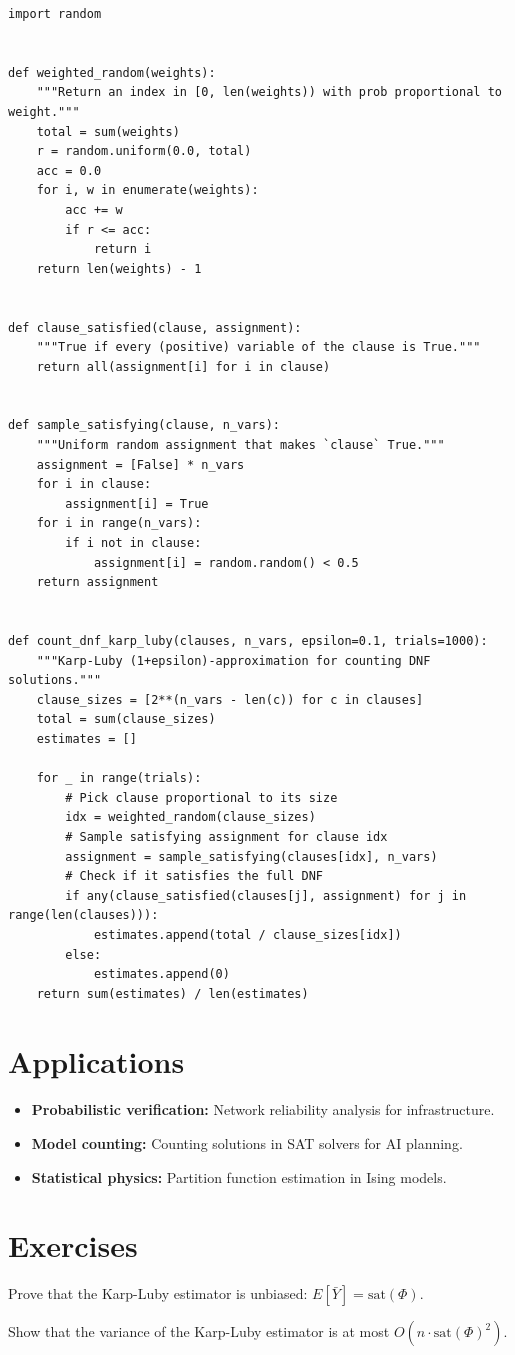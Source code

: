 \begin{lstlisting}[style=python, caption=Karp-Luby DNF Counting~\cite{karp-luby83}]
import random


def weighted_random(weights):
    """Return an index in [0, len(weights)) with prob proportional to weight."""
    total = sum(weights)
    r = random.uniform(0.0, total)
    acc = 0.0
    for i, w in enumerate(weights):
        acc += w
        if r <= acc:
            return i
    return len(weights) - 1


def clause_satisfied(clause, assignment):
    """True if every (positive) variable of the clause is True."""
    return all(assignment[i] for i in clause)


def sample_satisfying(clause, n_vars):
    """Uniform random assignment that makes `clause` True."""
    assignment = [False] * n_vars
    for i in clause:
        assignment[i] = True
    for i in range(n_vars):
        if i not in clause:
            assignment[i] = random.random() < 0.5
    return assignment


def count_dnf_karp_luby(clauses, n_vars, epsilon=0.1, trials=1000):
    """Karp-Luby (1+epsilon)-approximation for counting DNF solutions."""
    clause_sizes = [2**(n_vars - len(c)) for c in clauses]
    total = sum(clause_sizes)
    estimates = []
    
    for _ in range(trials):
        # Pick clause proportional to its size
        idx = weighted_random(clause_sizes)
        # Sample satisfying assignment for clause idx
        assignment = sample_satisfying(clauses[idx], n_vars)
        # Check if it satisfies the full DNF
        if any(clause_satisfied(clauses[j], assignment) for j in range(len(clauses))):
            estimates.append(total / clause_sizes[idx])
        else:
            estimates.append(0)
    return sum(estimates) / len(estimates)
\end{lstlisting}

\section{Applications}
\begin{itemize}
    \item \textbf{Probabilistic verification:} Network reliability analysis for infrastructure.
    \item \textbf{Model counting:} Counting solutions in SAT solvers for AI planning.
    \item \textbf{Statistical physics:} Partition function estimation in Ising models.
\end{itemize}

\section{Exercises}
\begin{exercise}
Prove that the Karp-Luby estimator is unbiased: $E[\bar{Y}] = \text{sat}(\Phi)$.
\end{exercise}
\begin{exercise}
Show that the variance of the Karp-Luby estimator is at most $O(n \cdot \text{sat}(\Phi)^2)$.
\end{exercise}


